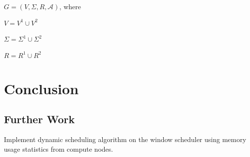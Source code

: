 \documentclass{llncs}
\newcommand{\tab}{\hspace*{2em}}
\begin{document}
\tab $G = (V, \Sigma , R, \mathcal{A})$, where

\tab $V = V^1\cup V^2$

\tab $\Sigma = \Sigma ^1\cup \Sigma ^2$

\tab $R = R^1\cup R^2$
\section{Conclusion}
\subsection{Further Work}
Implement dynamic scheduling algorithm on the window scheduler using memory usage statistics from compute nodes. 



\end{document}
